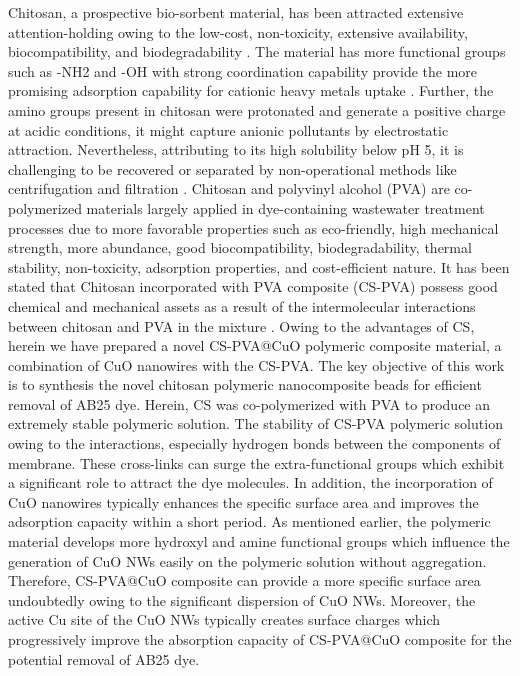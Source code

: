 \documentclass[final,5p,times,twocolumn,authoryear]{elsarticle}
\begin{document}
Chitosan, a prospective bio-sorbent material, has been attracted extensive attention-holding owing to the low-cost, non-toxicity, extensive availability, biocompatibility, and biodegradability \cite{19,20}. The material has more functional groups such as -NH2 and -OH with strong coordination capability provide the more promising adsorption capability for cationic heavy metals uptake \cite{21}. Further, the amino groups present in chitosan were protonated and generate a positive charge at acidic conditions, it might capture anionic pollutants by electrostatic attraction. Nevertheless, attributing to its high solubility below pH 5, it is challenging to be recovered or separated by non-operational methods like centrifugation and filtration \cite{22}. Chitosan and polyvinyl alcohol (PVA) are co-polymerized materials largely applied in dye-containing wastewater treatment processes due to more favorable properties such as eco-friendly, high mechanical strength, more abundance, good biocompatibility, biodegradability, thermal stability, non-toxicity, adsorption properties, and cost-efficient nature. It has been stated that Chitosan incorporated with PVA composite (CS-PVA) possess good chemical and mechanical assets as a result of the intermolecular interactions between chitosan and PVA in the mixture \cite{23}. Owing to the advantages of CS, herein we have prepared a novel CS-PVA@CuO polymeric composite material, a combination of CuO nanowires with the CS-PVA.
The key objective of this work is to synthesis the novel chitosan polymeric nanocomposite beads for efficient removal of AB25 dye. Herein, CS was co-polymerized with PVA to produce an extremely stable polymeric solution. The stability of CS-PVA polymeric solution owing to the interactions, especially hydrogen bonds between the components of membrane. These cross-links can surge the extra-functional groups which exhibit a significant role to attract the dye molecules. In addition, the incorporation of CuO nanowires typically enhances the specific surface area and improves the adsorption capacity within a short period. As mentioned earlier, the polymeric material develops more hydroxyl and amine functional groups which influence the generation of CuO NWs easily on the polymeric solution without aggregation. Therefore, CS-PVA@CuO composite can provide a more specific surface area undoubtedly owing to the significant dispersion of CuO NWs. Moreover, the active Cu site of the CuO NWs typically creates surface charges which progressively improve the absorption capacity of CS-PVA@CuO composite for the potential removal of AB25 dye.
\end{document}
